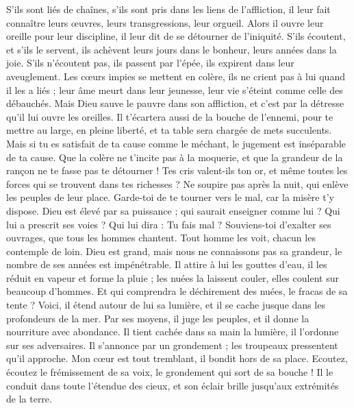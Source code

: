 \begin{multicols}{2}
S'ils sont liés de chaînes, s'ils sont pris dans les liens de l'affliction,
il leur fait connaître leurs œuvres, leurs transgressions, leur orgueil.
Alors il ouvre leur oreille pour leur discipline, il leur dit de se détourner de l'iniquité.
S'ils écoutent, et s'ils le servent, ils achèvent leurs jours dans le bonheur, leurs années dans la joie.
S'ils n'écoutent pas, ils passent par l'épée, ils expirent dans leur aveuglement.
Les cœurs impies se mettent en colère, ils ne crient pas à lui quand il les a liés ;
leur âme meurt dans leur jeunesse, leur vie s'éteint comme celle des débauchés.
Mais Dieu sauve le pauvre dans son affliction, et c'est par la détresse qu'il lui ouvre les oreilles.
Il t'écartera aussi de la bouche de l'ennemi, pour te mettre au large, en pleine liberté, et ta table sera chargée de mets succulents.
Mais si tu es satisfait de ta cause comme le méchant, le jugement est inséparable de ta cause.
Que la colère ne t'incite pas à la moquerie, et que la grandeur de la rançon ne te fasse pas te détourner !
Tes cris valent-ils ton or, et même toutes les forces qui se trouvent dans tes richesses ?
Ne soupire pas après la nuit, qui enlève les peuples de leur place.
Garde-toi de te tourner vers le mal, car la misère t'y dispose.
Dieu est élevé par sa puissance ; qui saurait enseigner comme lui ?
Qui lui a prescrit ses voies ? Qui lui dira : Tu fais mal ?
Souviens-toi d'exalter ses ouvrages, que tous les hommes chantent.
Tout homme les voit, chacun les contemple de loin.
Dieu est grand, mais nous ne connaissons pas sa grandeur, le nombre de ses années est impénétrable.
Il attire à lui les gouttes d'eau, il les réduit en vapeur et forme la pluie ;
les nuées la laissent couler, elles coulent sur beaucoup d'hommes.
Et qui comprendra le déchirement des nuées, le fracas de sa tente ?
Voici, il étend autour de lui sa lumière, et il se cache jusque dans les profondeurs de la mer.
Par ses moyens, il juge les peuples, et il donne la nourriture avec abondance.
Il tient cachée dans sa main la lumière, il l'ordonne sur ses adversaires.
Il s'annonce par un grondement ; les troupeaux pressentent qu'il approche.
\VerseOne{}Mon cœur est tout tremblant, il bondit hors de sa place.
Ecoutez, écoutez le frémissement de sa voix, le grondement qui sort de sa bouche !
Il le conduit dans toute l'étendue des cieux, et son éclair brille jusqu'aux extrémités de la terre.

\end{multicols}
